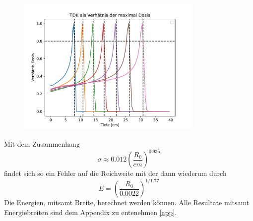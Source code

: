 \begin{figure}
    \includegraphics[width = 0.8\textwidth]{../poject/task1/task1b.pdf}
\end{figure} 
\noindent
Mit dem Zusammenhang 
\begin{equation}
    \sigma \approx 0.012 \left( \frac{R_0}{cm} \right) ^{0.935}
\end{equation}
findet sich so ein Fehler auf die Reichweite mit der dann wiederum durch 
\begin{equation}
    E = \left( \frac{R_0}{0.0022} \right)^{1/1.77}
\end{equation}
Die Energien, mitsamt Breite, berechnet werden können.  
Alle Resultate mitsamt Energiebreiten sind dem Appendix zu entenehmen \ref{app}.
\newpage